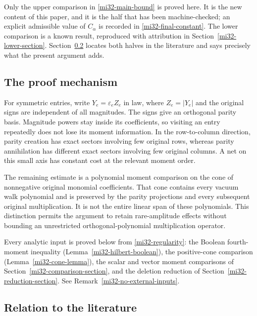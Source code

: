 \documentclass[11pt]{article}
\theoremstyle{definition}
\theoremstyle{remark}
\begin{document}
Only the upper comparison in \eqref{mi32-main-bound} is proved here. It
is the new content of this paper, and it is the half that has been
machine-checked; an explicit admissible value of $C_\alpha$ is recorded
in \eqref{mi32-final-constant}. The lower comparison is a known result,
reproduced with attribution in Section~\ref{mi32-lower-section}.
Section~\ref{mi32-literature} locates both halves in the literature and
says precisely what the present argument adds.

\subsection{The proof mechanism}

For symmetric entries, write $Y_e=\varepsilon_e Z_e$ in law, where
$Z_e=|Y_e|$ and the original signs are independent of all magnitudes.
The signs give an orthogonal parity basis. Magnitude powers stay inside
its coefficients, so visiting an entry repeatedly does not lose its
moment information. In the row-to-column direction, parity creation
has exact sectors involving few original rows, whereas parity
annihilation has different exact sectors involving few original
columns. A net on this small axis has constant cost at the relevant
moment order.

The remaining estimate is a polynomial moment comparison on the cone
of nonnegative original monomial coefficients. That cone contains
every vacuum walk polynomial and is preserved by the parity projections
and every subsequent original multiplication. It is not the entire
linear span of these polynomials. This distinction permits the argument
to retain rare-amplitude effects without bounding an unrestricted
orthogonal-polynomial multiplication operator.

Every analytic input is proved below from \eqref{mi32-regularity}: the
Boolean fourth-moment inequality
(Lemma~\ref{mi32-hilbert-boolean}), the positive-cone comparison
(Lemma~\ref{mi32-cone-lemma}), the scalar and vector moment comparisons
of Section~\ref{mi32-comparison-section}, and the deletion reduction of
Section~\ref{mi32-reduction-section}. See
Remark~\ref{mi32-no-external-inputs}.

\subsection{Relation to the literature}
\label{mi32-literature}
\end{document}
